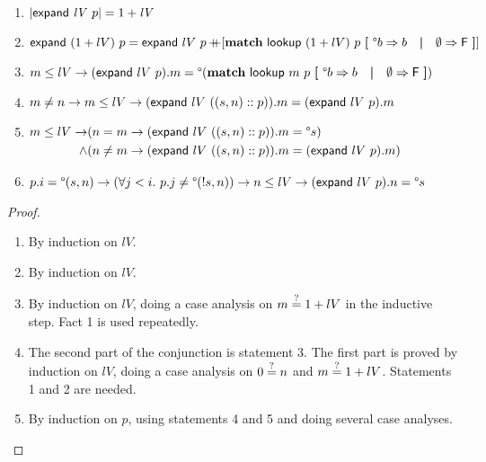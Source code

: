 \documentclass[a4paper,UKenglish,cleveref, autoref]{lipics-v2019}
\begin{document}
\begin{lemma}\label{prop:expandtech}\leavevmode
  \begin{enumerate}
    \item $|\normalfont\textsf{expand}~\mathit{lV}~p| = 1 +{\mathit{lV}}$
    \item $\normalfont\textsf{expand}~(1 +{lV})~p = \normalfont\textsf{expand}~lV~p \mathop{{+}\!\!\!{+}} [\textbf{match}~ \normalfont\textsf{lookup}~(1 +{lV})~p ~\textbf{[}~ \degree b \Rightarrow b \quad\textbf{|}\quad \emptyset \Rightarrow \mathsf{F} ~\textbf{]}]$
    \item $m \le lV \rightarrow (\normalfont\textsf{expand}~lV~p).m = \degree(\textbf{match}~ \normalfont\textsf{lookup}~m~p ~\textbf{[}~ \degree b \Rightarrow b \quad\textbf{|}\quad \emptyset \Rightarrow \mathsf{F} ~\textbf{]})$
    \item $m \neq n \rightarrow m \le lV \rightarrow (\normalfont\textsf{expand}~lV~((s, n) :: p)).m = (\normalfont\textsf{expand}~lV~p).m$
    \item $\begin{aligned}[t]
        m \le lV \rightarrow & (n = m \rightarrow (\normalfont\textsf{expand}~lV~((s, n) :: p)).m = \degree s) \\
      \land & (n \neq m \rightarrow (\normalfont\textsf{expand}~lV~((s, n) :: p)).m = (\normalfont\textsf{expand}~lV~p).m)
    \end{aligned}
    $
  \item $p.i = \degree(s, n) \rightarrow (\forall j < i.~p.j \neq \degree(!{s}, n)) \rightarrow n \le lV \rightarrow (\normalfont\textsf{expand}~lV~p).n = \degree s$
  \end{enumerate}
\end{lemma}
\begin{proof}
  \begin{enumerate}
    \item By induction on $lV$.
    \item By induction on $lV$.
    \item By induction on $lV$, doing a case analysis on $m\overset{?}{=}1 +{lV}$ in the inductive step. Fact 1 is used repeatedly.
    \item The second part of the conjunction is statement 3. The first part is proved by induction on $lV$, doing a case analysis on $0\overset{?}{=}n$ and $m\overset{?}{=}1 +{lV}$. Statements 1 and 2 are needed. 
    \item By induction on $p$, using statements 4 and 5 and doing several case analyses.
  \end{enumerate}
\end{proof}
\end{document}
